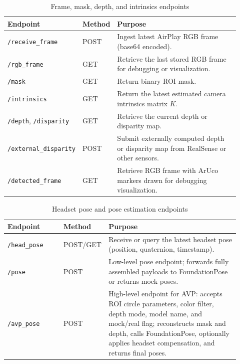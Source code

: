 \begin{table}[H]
    \centering
    \caption{Frame, mask, depth, and intrinsics endpoints}
    \label{tab:endpoints-frame}
    \begin{tabular}{p{0.24\linewidth}p{0.11\linewidth}p{0.57\linewidth}}
        \toprule
        \textbf{Endpoint} & \textbf{Method} & \textbf{Purpose} \\
        \midrule
        \texttt{/receive\_frame} & POST &
        Ingest latest AirPlay RGB frame (base64 encoded). \\
        \texttt{/rgb\_frame} & GET &
        Retrieve the last stored RGB frame for debugging or visualization. \\
        \texttt{/mask} & GET &
        Return binary ROI mask. \\
        \texttt{/intrinsics} & GET &
        Return the latest estimated camera intrinsics matrix $K$. \\
        \texttt{/depth}, \texttt{/disparity} & GET &
        Retrieve the current depth or disparity map. \\
        \texttt{/external\_disparity} & POST &
        Submit externally computed depth or disparity map from RealSense or other sensors. \\
        \texttt{/detected\_frame} & GET &
        Retrieve RGB frame with ArUco markers drawn for debugging visualization. \\
        \bottomrule
    \end{tabular}
\end{table}

\begin{table}[H]
    \centering
    \caption{Headset pose and pose estimation endpoints}
    \label{tab:endpoints-pose}
    \begin{tabular}{p{0.24\linewidth}p{0.11\linewidth}p{0.57\linewidth}}
        \toprule
        \textbf{Endpoint} & \textbf{Method} & \textbf{Purpose} \\
        \midrule
        \texttt{/head\_pose} & POST/GET &
        Receive or query the latest headset pose (position, quaternion, timestamp). \\
        \texttt{/pose} & POST &
        Low-level pose endpoint; forwards fully assembled payloads to FoundationPose or returns mock poses. \\
        \texttt{/avp\_pose} & POST &
        High-level endpoint for AVP: accepts ROI circle parameters, color filter, depth mode, model name, and mock/real flag; reconstructs mask and depth, calls FoundationPose, optionally applies headset compensation, and returns final poses. \\
        \bottomrule
    \end{tabular}
\end{table}

